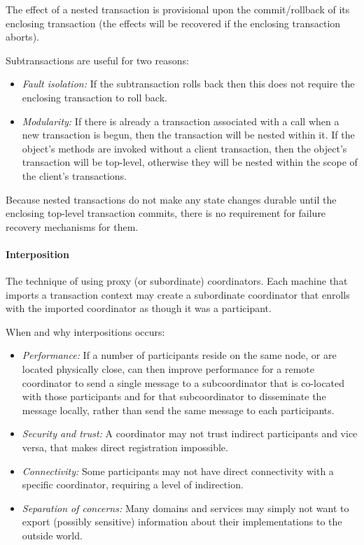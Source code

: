 The effect of a nested transaction is provisional upon the commit/rollback of its enclosing transaction (the effects will be recovered if the enclosing transaction aborts).

Subtransactions are useful for two reasons:
\begin{itemize}[nolistsep,noitemsep]
  \item \textit{Fault isolation:} If the subtransaction rolls back then this does not require the enclosing transaction to roll back.
  \item \textit{Modularity:} If there is already a transaction associated with a call when a new transaction is begun, then the transaction will be nested within it. If the object's methods are invoked without a client transaction, then the object's transaction will be top-level, otherwise they will be nested within the scope of the client's transactions.
\end{itemize}

Because nested transactions do not make any state changes durable until the enclosing top-level transaction commits, there is no requirement for failure recovery mechanisms for them.

\paragraph{Interposition} The technique of using proxy (or subordinate) coordinators. Each machine that imports a transaction context may create a subordinate coordinator that enrolls with the imported coordinator as though it was a participant.

When and why interpositions occurs:
\begin{itemize}[nolistsep,noitemsep]
  \item \textit{Performance:} If a number of participants reside on the same node, or are located physically close, can then improve performance for a remote coordinator to send a single message to a subcoordinator that is co-located with those participants and for that subcoordinator to disseminate the message locally, rather than send the same message to each participants.
  \item \textit{Security and trust:} A coordinator may not trust indirect participants and vice versa, that makes direct registration impossible.
  \item \textit{Connectivity:} Some participants may not have direct connectivity with a specific coordinator, requiring a level of indirection.
  \item \textit{Separation of concerns:} Many domains and services may simply not want to export (possibly sensitive) information about their implementations to the outside world.
\end{itemize}

